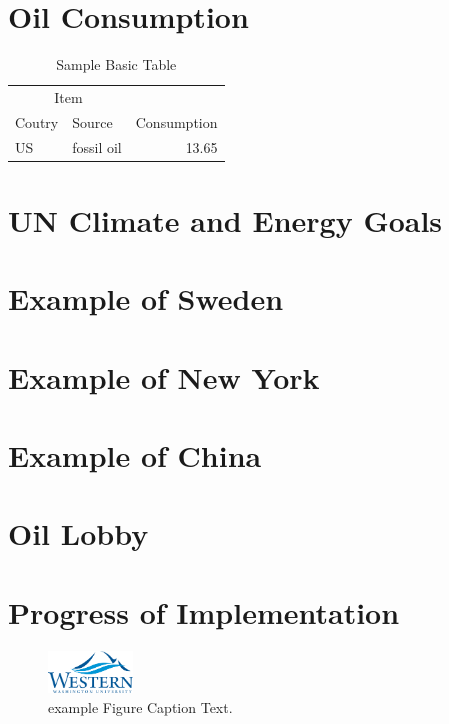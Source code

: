 \section{Oil Consumption}
\begin{table}

  \caption{Sample Basic Table}
  \label{tab:BasicTable}
  \begin{tabular}{@{}llr@{}}         \toprule
  \multicolumn{2}{c}{Item}        \\ \cmidrule(r){1-2}
  Coutry    & Source & Consumption \\ \midrule
  US      & fossil oil   & 13.65 \\
  \end{tabular}
\end{table}

\cite{NYT1}
\section{UN Climate and Energy Goals}
\section{Example of Sweden}
\section{Example of New York}
\section{Example of China}
\section{Oil Lobby}
\section{Progress of Implementation}


\begin{figure}
    \includegraphics[width=0.2\textwidth]{graphics/logoWWU.png} 
    \caption{example Figure Caption Text.}
    \label{fig:figures/figureName}
\end{figure}
